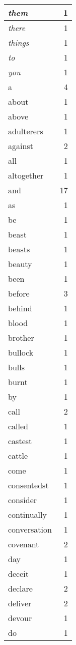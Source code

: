 \begin{center}
\begin{longtable}{l|r}
\emph{them} & 1 \\ \hline
\emph{there} & 1 \\ \hline
\emph{things} & 1 \\ \hline
\emph{to} & 1 \\ \hline
\emph{you} & 1 \\ \hline
a & 4 \\ \hline
about & 1 \\ \hline
above & 1 \\ \hline
adulterers & 1 \\ \hline
against & 2 \\ \hline
all & 1 \\ \hline
altogether & 1 \\ \hline
and & 17 \\ \hline
as & 1 \\ \hline
be & 1 \\ \hline
beast & 1 \\ \hline
beasts & 1 \\ \hline
beauty & 1 \\ \hline
been & 1 \\ \hline
before & 3 \\ \hline
behind & 1 \\ \hline
blood & 1 \\ \hline
brother & 1 \\ \hline
bullock & 1 \\ \hline
bulls & 1 \\ \hline
burnt & 1 \\ \hline
by & 1 \\ \hline
call & 2 \\ \hline
called & 1 \\ \hline
castest & 1 \\ \hline
cattle & 1 \\ \hline
come & 1 \\ \hline
consentedst & 1 \\ \hline
consider & 1 \\ \hline
continually & 1 \\ \hline
conversation & 1 \\ \hline
covenant & 2 \\ \hline
day & 1 \\ \hline
deceit & 1 \\ \hline
declare & 2 \\ \hline
deliver & 2 \\ \hline
devour & 1 \\ \hline
do & 1 \\ \hline

\end{longtable}
\end{center}
